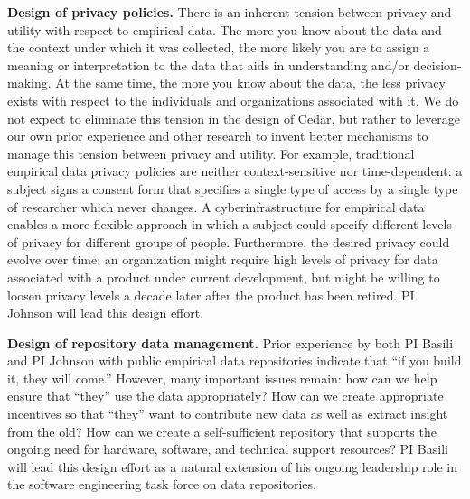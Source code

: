 {\bf Design of privacy policies.} There is an inherent tension between privacy and
utility with respect to empirical data.  The more you know about the data
and the context under which it was collected, the more likely you are to
assign a meaning or interpretation to the data that aids in understanding
and/or decision-making. At the same time, the more you know about the data,
the less privacy exists with respect to the individuals and organizations
associated with it.  We do not expect to eliminate this tension in the
design of Cedar, but rather to leverage our own prior experience and other
research to invent better mechanisms to manage this tension between privacy
and utility.  For example, traditional empirical data privacy policies are
neither context-sensitive nor time-dependent: a subject signs a consent
form that specifies a single type of access by a single type of researcher
which never changes.  A cyberinfrastructure for empirical data enables a
more flexible approach in which a subject could specify different levels of
privacy for different groups of people.  Furthermore, the desired privacy
could evolve over time: an organization might require high levels of
privacy for data associated with a product under current development, but
might be willing to loosen privacy levels a decade later after the product
has been retired.  PI Johnson will lead this design effort.

{\bf Design of repository data management.}  Prior experience by both PI Basili and
PI Johnson with public empirical data repositories indicate that ``if you
build it, they will come.''  However, many important issues remain: how can
we help ensure that ``they'' use the data appropriately? How can we create
appropriate incentives so that ``they'' want to contribute new data as well
as extract insight from the old?  How can we create a self-sufficient
repository that supports the ongoing need for hardware, software, and
technical support resources?  PI Basili will lead this design effort as a
natural extension of his ongoing leadership role in the software
engineering task force on data repositories.


